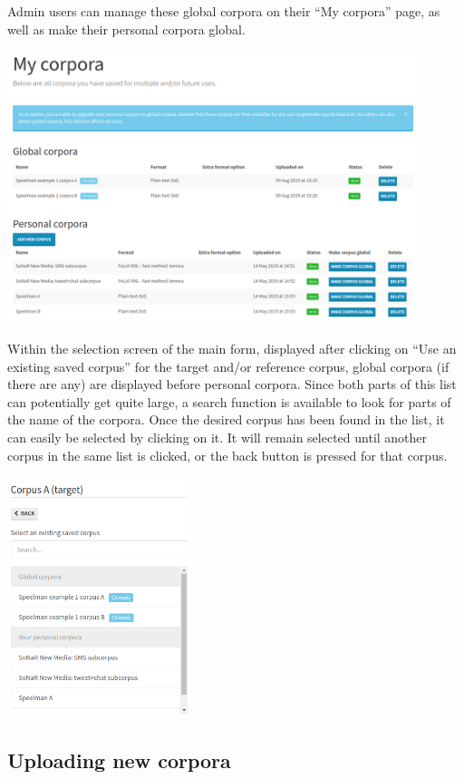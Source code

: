\documentclass[11pt,a4paper]{article}
\begin{document}
Admin users can manage these global corpora on their ``My corpora'' page, as well as make their personal corpora global.

\centerline{\includegraphics[width=0.9\textwidth]{images/admincorpora.png}}

Within the selection screen of the main form, displayed after clicking on ``Use an existing saved corpus'' for the target and/or reference corpus, global corpora (if there are any) are displayed before personal corpora. Since both parts of this list can potentially get quite large, a search function is available to look for parts of the name of the corpora. Once the desired corpus has been found in the list, it can easily be selected by clicking on it. It will remain selected until another corpus in the same list is clicked, or the back button is pressed for that corpus.

\centerline{\includegraphics[width=0.4\textwidth]{images/corpusselect.png}}

\subsection{Uploading new corpora}
\end{document}
